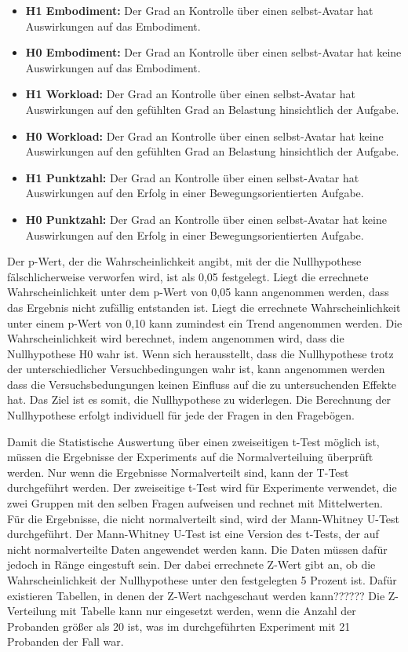 \begin{itemize} 

\item \textbf{H1 Embodiment:} Der Grad an Kontrolle über einen selbst-Avatar hat Auswirkungen auf das Embodiment.
\item \textbf{H0 Embodiment:} Der Grad an Kontrolle über einen selbst-Avatar hat keine Auswirkungen auf das Embodiment.

\item \textbf{H1 Workload:} Der Grad an Kontrolle über einen selbst-Avatar hat Auswirkungen auf den gefühlten Grad an Belastung hinsichtlich der Aufgabe.
\item \textbf{H0 Workload:} Der Grad an Kontrolle über einen selbst-Avatar hat keine Auswirkungen auf den gefühlten Grad an Belastung hinsichtlich der Aufgabe.

\item \textbf{H1 Punktzahl:} Der Grad an Kontrolle über einen selbst-Avatar hat Auswirkungen auf den Erfolg in einer Bewegungsorientierten Aufgabe.
\item \textbf{H0 Punktzahl:} Der Grad an Kontrolle über einen selbst-Avatar hat keine Auswirkungen auf den Erfolg in einer Bewegungsorientierten Aufgabe.

\end{itemize}

Der p-Wert, der die Wahrscheinlichkeit angibt, mit der die Nullhypothese fälschlicherweise verworfen wird, ist als 0,05 festgelegt.
Liegt die errechnete Wahrscheinlichkeit unter dem p-Wert von 0,05 kann angenommen werden, dass das Ergebnis nicht zufällig entstanden ist. Liegt die errechnete Wahrscheinlichkeit unter einem p-Wert von 0,10 kann zumindest ein Trend angenommen werden.
Die Wahrscheinlichkeit wird berechnet, indem angenommen wird, dass die Nullhypothese H0 wahr ist. Wenn sich herausstellt, dass die Nullhypothese trotz der unterschiedlicher Versuchbedingungen wahr ist, kann angenommen werden dass die Versuchsbedungungen keinen Einfluss auf die zu untersuchenden Effekte hat. Das Ziel ist es somit, die Nullhypothese zu widerlegen.
Die Berechnung der Nullhypothese erfolgt individuell für jede der Fragen in den Fragebögen.

Damit die Statistische Auswertung über einen zweiseitigen t-Test möglich ist, müssen die Ergebnisse der Experiments auf die Normalverteiluing überprüft werden. Nur wenn die Ergebnisse Normalverteilt sind, kann der T-Test durchgeführt werden. Der zweiseitige t-Test wird für Experimente verwendet, die zwei Gruppen mit den selben Fragen aufweisen und rechnet mit Mittelwerten. Für die Ergebnisse, die nicht normalverteilt sind, wird der Mann-Whitney U-Test durchgeführt. Der Mann-Whitney U-Test ist eine Version des t-Tests, der auf nicht normalverteilte Daten angewendet werden kann. Die Daten müssen dafür jedoch in Ränge eingestuft sein. Der dabei errechnete Z-Wert gibt an, ob die Wahrscheinlichkeit der Nullhypothese unter den festgelegten 5 Prozent ist. Dafür existieren Tabellen, in denen der Z-Wert nachgeschaut werden kann?????? Die Z-Verteilung mit Tabelle kann nur eingesetzt werden, wenn die Anzahl der Probanden größer als 20 ist, was im durchgeführten Experiment mit 21 Probanden der Fall war.


